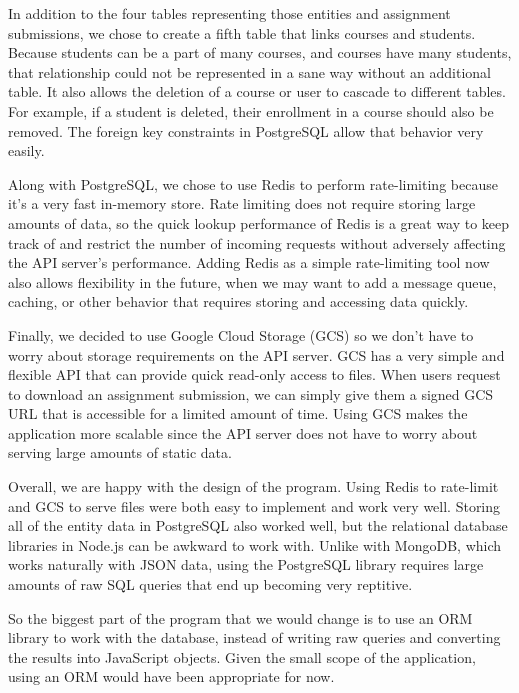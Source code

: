 \documentclass[11pt]{article}
\begin{document}
In addition to the four tables representing those entities and assignment submissions, we chose to create a fifth table that links courses and students. Because students can be a part of many courses, and courses have many students, that relationship could not be represented in a sane way without an additional table. It also allows the deletion of a course or user to cascade to different tables. For example, if a student is deleted, their enrollment in a course should also be removed. The foreign key constraints in PostgreSQL allow that behavior very easily.

Along with PostgreSQL, we chose to use Redis to perform rate-limiting because it's a very fast in-memory store. Rate limiting does not require storing large amounts of data, so the quick lookup performance of Redis is a great way to keep track of and restrict the number of incoming requests without adversely affecting the API server's performance. Adding Redis as a simple rate-limiting tool now also allows flexibility in the future, when we may want to add a message queue, caching, or other behavior that requires storing and accessing data quickly.

Finally, we decided to use Google Cloud Storage (GCS) so we don't have to worry about storage requirements on the API server. GCS has a very simple and flexible API that can provide quick read-only access to files. When users request to download an assignment submission, we can simply give them a signed GCS URL that is accessible for a limited amount of time. Using GCS makes the application more scalable since the API server does not have to worry about serving large amounts of static data.

Overall, we are happy with the design of the program. Using Redis to rate-limit and GCS to serve files were both easy to implement and work very well. Storing all of the entity data in PostgreSQL also worked well, but the relational database libraries in Node.js can be awkward to work with. Unlike with MongoDB, which works naturally with JSON data, using the PostgreSQL library requires large amounts of raw SQL queries that end up becoming very reptitive.

So the biggest part of the program that we would change is to use an ORM library to work with the database, instead of writing raw queries and converting the results into JavaScript objects. Given the small scope of the application, using an ORM would have been appropriate for now.
\end{document}
